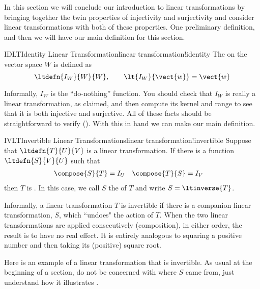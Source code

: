 %
In this section we will conclude our introduction to linear transformations by bringing together the twin properties of injectivity and surjectivity and consider linear transformations with both of these properties.
%
%
One preliminary definition, and then we will have our main definition for this section.
%
%
\begin{definition}{IDLT}{Identity Linear Transformation}{linear transformation!identity}
The  on the vector space $W$ is defined as
%
\begin{equation*}
\ltdefn{I_W}{W}{W},\quad\quad \lt{I_W}{\vect{w}}=\vect{w}
\end{equation*}
%
\end{definition}
%
Informally, $I_W$ is the ``do-nothing'' function.  You should check that $I_W$ is really a linear transformation, as claimed, and then compute its kernel and range to see that it is both injective and surjective.  All of these facts should be straightforward to verify ().  With this in hand we can make our main definition.
%
%
\begin{definition}{IVLT}{Invertible Linear Transformations}{linear transformation!invertible}
Suppose that $\ltdefn{T}{U}{V}$ is a linear transformation.  If there is a function $\ltdefn{S}{V}{U}$ such that 
%
\begin{align*}
\compose{S}{T}&=I_U & \compose{T}{S}&=I_V
\end{align*}
%
then $T$ is .  In this case, we call $S$ the  of $T$ and write $S=\ltinverse{T}$.
\end{definition}
%
Informally, a linear transformation $T$ is invertible if there is a companion linear transformation, $S$, which ``undoes" the action of $T$.  When the two linear transformations are applied consecutively (composition), in either order, the result is to have no real effect.  It is entirely analogous to squaring a positive number and then taking its (positive) square root.\par
%
Here is an example of a linear transformation that is invertible.  As usual at the beginning of a section, do not be concerned with where $S$ came from, just understand how it illustrates .
